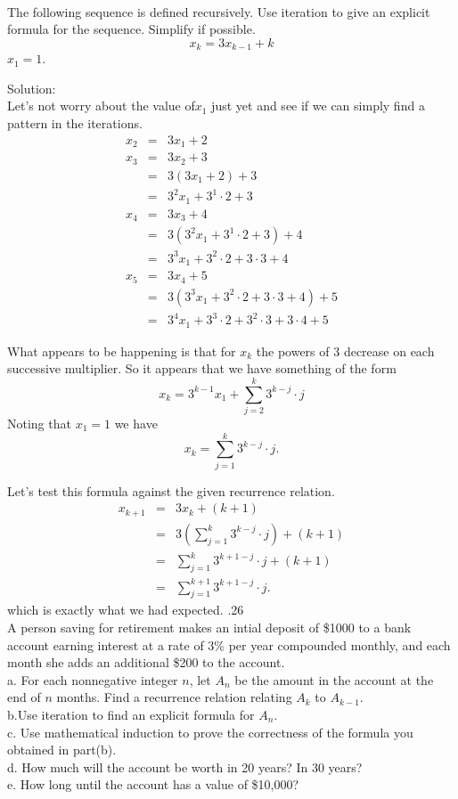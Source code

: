 \documentclass[10 pt]{amsart}
\theoremstyle{definition}
\theoremstyle{remark}
\numberwithin{equation}{subsection}
\begin{document}
\\
The following sequence is defined recursively.  Use iteration to give an explicit formula for the sequence.  Simplify if possible.
\[
x_{k} = 3x_{k-1}+k
\]
$x_1=1$.

Solution:\\
Let's not worry about the value of$x_1$ just yet and see if we can simply find a pattern in the iterations.
\begin{eqnarray*}
x_2 & = & 3x_1+2\\
x_3 &=& 3x_2+3\\
&=& 3(3x_1+2)+3\\
&=& 3^2x_1 + 3^1\cdot 2 + 3\\
x_4 &=& 3x_3+4\\
&=& 3(3^2x_1 + 3^1\cdot 2 + 3)+4\\
&=& 3^3 x_1 + 3^2\cdot 2+ 3\cdot 3 + 4\\
x_5 &=& 3x_4+5\\
&=& 3(3^3 x_1 + 3^2\cdot 2+ 3\cdot 3 + 4)+5\\
&=& 3^4x_1+3^3\cdot2+3^2\cdot 3+3\cdot 4 +5
\end{eqnarray*}

What appears to be happening is that for $x_k$ the powers of 3 decrease on each successive multiplier.  So it appears that we have something of the form
\[
x_k = 3^{k-1}x_1 + \sum_{j=2}^{k}3^{k-j}\cdot j
\]
Noting that $x_1=1$ we have
\[
x_k = \sum_{j=1}^{k}3^{k-j}\cdot j.
\]

Let's test this formula against the given recurrence relation.
\begin{eqnarray*}
x_{k+1} &=&  3x_k+(k+1)\\
&=& 3(\sum_{j=1}^{k}3^{k-j}\cdot j)+(k+1)\\
&=& \sum_{j=1}^{k}3^{k+1-j}\cdot j + (k+1)\\
&=& \sum_{j=1}^{k+1}3^{k+1-j}\cdot j.
\end{eqnarray*}
which is exactly what we had expected.
.26\\
A person saving for retirement makes an intial deposit of \$1000 to a bank account earning interest at a rate of 3\% per year compounded monthly, and each month she adds an additional \$200 to the account.\\
a. For each nonnegative integer $n$, let $A_n$ be the amount in the account at the end of $n$ months.  Find a recurrence relation relating $A_k$ to $A_{k-1}$.\\
b.Use iteration to find an explicit formula for $A_n$.\\
c. Use mathematical induction to prove the correctness of the formula you obtained in part(b).\\
d. How much will the account be worth in 20 years? In 30 years?\\
e. How long until the account has a value of \$10,000?
\end{document}
